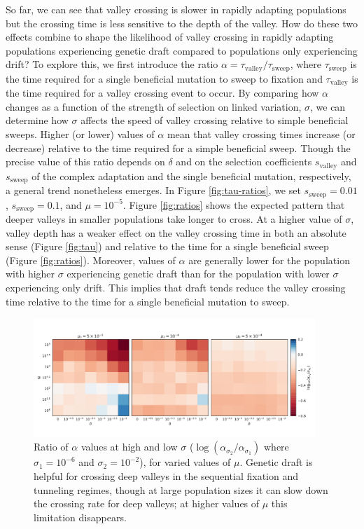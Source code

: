 \documentclass[rmp]{revtex4}
\begin{document}
\begin{spacing}{1.5}
So far, we can see that valley crossing is slower in rapidly adapting populations but the crossing time is less sensitive to the depth of the valley.
How do these two effects combine to shape the likelihood of valley crossing in rapidly adapting populations experiencing genetic draft compared to populations only experiencing drift?
To explore this, we first introduce the ratio $\alpha = \tau_{\mathrm{valley}}/\tau_{\mathrm{sweep}}$, where $\tau_{\mathrm{sweep}}$ is the time required for a single beneficial mutation to sweep to fixation and $\tau_{\mathrm{valley}}$ is the time required for a valley crossing event to occur.
By comparing how $\alpha$ changes as a function of the strength of selection on linked variation, $\sigma$, we can determine how $\sigma$ affects the speed of valley crossing relative to simple beneficial sweeps. Higher (or lower) values of $\alpha$ mean that valley crossing times increase (or decrease) relative to the time required for a simple beneficial sweep.
Though the precise value of this ratio depends on $\delta$ and on the selection coefficients $s_{\mathrm{valley}}$ and $s_{\mathrm{sweep}}$ of the complex adaptation and the single beneficial mutation, respectively, a general trend nonetheless emerges.
In Figure \ref{fig:tau-ratios}, we set $s_{\mathrm{sweep}} = 0.01$, $s_{\mathrm{sweep}} = 0.1$, and $\mu = 10^{-5}$.
Figure \ref{fig:ratios} shows the expected pattern that deeper valleys in smaller populations take longer to cross.
At a higher value of $\sigma$, valley depth has a weaker effect on the valley crossing time in both an absolute sense (Figure \ref{fig:tau}) and relative to the time for a single beneficial sweep (Figure \ref{fig:ratios}).
Moreover, values of $\alpha$ are generally lower for the population with higher $\sigma$ experiencing genetic draft than for the population with lower $\sigma$ experiencing only drift.
This implies that draft tends reduce the valley crossing time relative to the time for a single beneficial mutation to sweep.

\begin{figure}[t]
\includegraphics[width=0.95\textwidth]{Figures/compare_ratios_multi.pdf}
\caption{Ratio of $\alpha$ values at high and low $\sigma$ ($\log \left( \alpha_{\sigma_2} / \alpha_{\sigma_1} \right)$ where $\sigma_1=10^{-6}$ and $\sigma_2=10^{-2}$), for varied values of $\mu$. Genetic draft is helpful for crossing deep valleys in the sequential fixation and tunneling regimes, though at large population sizes it can slow down the crossing rate for deep valleys; at higher values of $\mu$ this limitation disappears.}
\label{fig:alpha_ratio}
\end{figure}


\end{spacing}
\end{document}

